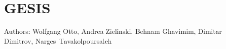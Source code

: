 \documentclass[fleqn]{template}
\begin{document}
    \section{GESIS}
    Authors: Wolfgang Otto, Andrea Zielinski, Behnam Ghavimim, Dimitar Dimitrov, Narges~Tavakolpoursaleh
    
    
    
    
    
    
    
    
\end{document}
